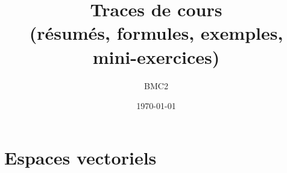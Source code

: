 \documentclass[11pt,a4paper]{report}
\title{\textbf{Traces de cours}\\\large (résumés, formules, exemples, mini-exercices)}
\author{ BMC2 }
\date{\today}
\begin{document}

% 





% 

\setcounter{chapter}{1}
\chapter{Espaces vectoriels}


\end{document}

